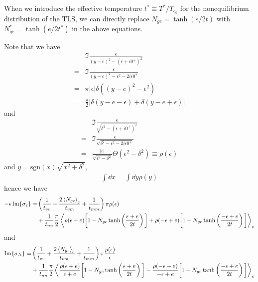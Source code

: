 \documentclass[aps,prl,preprint]{revtex4-2}
\begin{document}
When we introduce the effective temperature $t^* \equiv T^*/T_{c_0}$ for the nonequilibrium distribution of the TLS,
we can directly replace $N_{ge} = \tanh(e/2t)$
with $N_{ge}^* = \tanh(e/2t^*)$ in the above equations.

Note that we have
\begin{align}
      & \Im{ \frac{\epsilon}{ (y-e)^2 - (\epsilon+i0^+)^2} }                  \\
    = & \Im{ \frac{\epsilon}{ (y-e)^2 - \epsilon^2 - 2i\epsilon 0^+ } }       \\
    = & \pi |\epsilon| \delta\left((y-e)^2-\epsilon^2\right)                  \\
    = & \frac{\pi}{2} \bigg[\delta(y-e-\epsilon) + \delta(y-e+\epsilon)\bigg]
\end{align}
and
\begin{align}
      & \Im{\frac{\epsilon}{\sqrt{\delta^2 - (\epsilon+i0^+)^2}}}                                      \\
    = & \Im{\frac{\epsilon}{\sqrt{\delta^2 - \epsilon^2 - 2i\epsilon 0^+}}}                            \\
    = & \frac{|\epsilon|}{\sqrt{\epsilon^2-\delta^2}}\Theta(\epsilon^2-\delta^2) \equiv \rho(\epsilon)
\end{align}
and $y = \text{sgn}(x)\sqrt{x^2+\delta^2}$,
\begin{align}
    \int\dd x = \int\dd y\rho(y)
\end{align}
hence we have
\begin{align}
    -\epsilon\Im{\sigma_\varepsilon} = & \left(\frac{1}{t_{vv}} + \frac{2\ev{N_{ge}}_e}{t_{vm}} + \frac{1}{t_{mm}}\right)\pi\rho(\epsilon)               \\
                                       & + \frac{1}{t_{nn}}\frac{\pi}{2} \ev{\rho(\epsilon+e)\bigg[1-N_{ge}\tanh\left(\frac{\epsilon+e}{2t}\right)\bigg]
    + \rho(-\epsilon+e)\bigg[1-N_{ge}\tanh\left(\frac{-\epsilon+e}{2t}\right)\bigg]}_e \nonumber
\end{align}
and
\begin{align}
    \Im{\sigma_\Delta} = & \left(\frac{1}{t_{vv}} + \frac{2\ev{N_{ge}}_e}{t_{vm}} + \frac{1}{t_{mm}}\right)\pi\frac{\rho(\epsilon)}{\epsilon}                 \\
                         & + \frac{1}{t_{nn}}\frac{\pi}{2} \ev{\frac{\rho(\epsilon+e)}{\epsilon+e}\bigg[1-N_{ge}\tanh\left(\frac{\epsilon+e}{2t}\right)\bigg]
    - \frac{\rho(-\epsilon+e)}{-\epsilon+e}\bigg[1-N_{ge}\tanh\left(\frac{-\epsilon+e}{2t}\right)\bigg]}_e \nonumber
\end{align}
\end{document}

